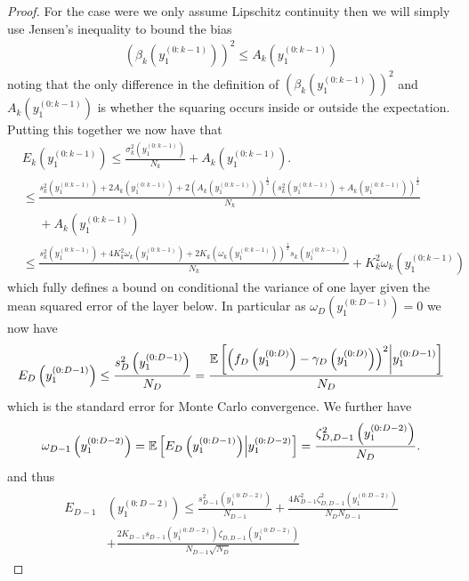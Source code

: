 \begin{proof}
For the case were we only assume Lipschitz continuity then we will simply
use Jensen's inequality to bound the bias
\begin{align*}
\left(\beta_k \left(y_1^{(0:k-1)}\right)\right)^2 \le
A_k \left(y_1^{(0:k-1)}\right)
\end{align*}
noting that the only difference in the definition of $\left(\beta_k \left(y_1^{(0:k-1)}\right)\right)^2$ and $A_k \left(y_1^{(0:k-1)}\right)$ is
whether the squaring occurs inside or outside the expectation.
Putting this together we now have that 
\begin{align}
&E_k \left(y_1^{(0:k-1)}\right) 
\le \frac{\sigma_k^2 \left(y_1^{(0:k-1)}\right)}{N_k} + A_k \left(y_1^{(0:k-1)}\right). \\
&\le \frac{s_k^2 \left(y_1^{(0:k-1)}\right) +
2A_k \left(y_1^{(0:k-1)}\right)
+2\left(A_k \left(y_1^{(0:k-1)}\right)\right)^{\frac{1}{2}}
\left(s_k^2 \left(y_1^{(0:k-1)}\right) + A_k \left(y_1^{(0:k-1)}\right)\right)^{\frac{1}{2}}}
{N_k} \nonumber\\
&\phantom{\le} +A_k \left(y_1^{(0:k-1)}\right)\nonumber\\
&\le \frac{s_k^2 \left(y_1^{(0:k-1)}\right) +
	4 K_k^2 \omega_k \left(y_1^{(0:k-1)}\right)
	+2 K_k \left(\omega_k \left(y_1^{(0:k-1)}\right)\right)^{\frac{1}{2}}
	s_k \left(y_1^{(0:k-1)}\right)}{N_k}+K_k^2 \omega_k \left(y_1^{(0:k-1)}\right)
\label{eq:general-bound-lip}
\end{align}
which fully defines a bound on conditional the variance of one layer given the mean squared error of the layer below.
In particular as $\omega_D \left(y_1^{(0:D-1)}\right) = 0$ we now have
\[
E_D \left(y_1^{(0:D-1)}\right) \le \frac{s_D^2 \left(y_1^{(0:D-1)}\right)}{N_D} = 
\frac{\mathbb{E} \left[\left(f_D\left(y_1^{(0:D)}\right)-\gamma_D\left(y_1^{(0:D)}\right)\right)^2 \middle| y_1^{(0:D-1)}	\right]}{N_D}
\]
which is the standard error for Monte Carlo convergence.  
We
further have 
\[
\omega_{D-1} \left(y_1^{(0:D-2)}\right) = 
\mathbb{E} \left[E_{D} 
\left(y_1^{(0:D-1)}\right) \middle|  y_1^{(0:D-2)} \right]
=
\frac{\zeta^2_{D,D-1}
	\left(y_1^{(0:D-2)}\right) }{N_D}.
\]
and thus
\begin{align}
\begin{split}
E_{D-1} &\left(y_1^{(0:D-2)}\right) \le  \frac{s_{D-1}^2 \left(y_1^{(0:D-2)}\right)}{N_{D-1}} +
	\frac{4 K_{D-1}^2 \zeta^2_{D,D-1}
		\left(y_1^{(0:D-2)}\right)}{N_D N_{D-1}} \\
\quad \quad &	+ \frac{2 K_{D-1}s_{D-1} \left(y_1^{(0:D-2)}\right)
		\zeta_{D,D-1}
		\left(y_1^{(0:D-2)}\right)}{N_{D-1} \sqrt{N_D}}

\end{split}
\end{align}
\end{proof}
